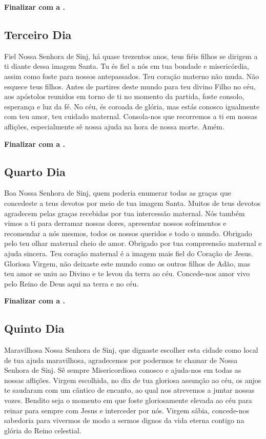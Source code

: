 \documentclass[a4paper,14pt]{extarticle} \usepackage[utf8]{inputenc}
\begin{document}
\noindent
\textbf{Finalizar com a .}


\subsection{Terceiro Dia}

\noindent

Fiel Nossa Senhora de Sinj, há quase trezentos anos, teus fiéis filhos se dirigem a ti diante dessa imagem Santa. Tu és fiel a nós em tua bondade e misericórdia, assim como foste para nossos antepassados. Teu coração materno não muda. Não esquece teus filhos. Antes de partires deste mundo para teu divino Filho no céu, aos apóstolos reunidos em torno de ti no momento da partida, foste consolo, esperança e luz da fé. No céu, és coroada de glória, mas estás conosco igualmente com teu amor, teu cuidado maternal. Consola-nos que recorremos a ti em nossas aflições, especialmente sê nossa ajuda na hora de nossa morte. Amém.

\noindent
\textbf{Finalizar com a .}


\subsection{Quarto Dia}

Boa Nossa Senhora de Sinj, quem poderia enumerar todas as graças que concedeste a teus devotos por meio de tua imagem Santa. Muitos de teus devotos agradecem pelas graças recebidas por tua intercessão maternal. Nós também vimos a ti para derramar nossas dores, apresentar nossos sofrimentos e recomendar a nós mesmos, todos os nossos queridos e todo o mundo. Obrigado pelo teu olhar maternal cheio de amor. Obrigado por tua compreensão maternal e ajuda sincera. Teu coração maternal é a imagem mais fiel do Coração de Jesus. Gloriosa Virgem, não deixaste este mundo como os outros filhos de Adão, mas teu amor se uniu ao Divino e te levou da terra ao céu. Concede-nos amor vivo pelo Reino de Deus aqui na terra e no céu.

\noindent
\textbf{Finalizar com a .}


\subsection{Quinto Dia}

Maravilhosa Nossa Senhora de Sinj, que dignaste escolher esta cidade como local de tua ajuda maravilhosa, agradecemos por podermos te chamar de Nossa Senhora de Sinj. Sê sempre Misericordiosa conosco e ajuda-nos em todas as nossas aflições. Virgem escolhida, no dia de tua gloriosa assunção ao céu, os anjos te saudaram com um cântico de encanto, ao qual nos atrevemos a juntar nossas vozes. Bendito seja o momento em que foste gloriosamente elevada ao céu para reinar para sempre com Jesus e interceder por nós. Virgem sábia, concede-nos sabedoria para vivermos de modo a sermos dignos da vida eterna contigo na glória do Reino celestial.
\end{document}

